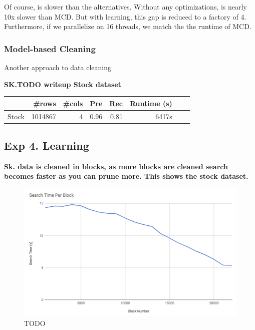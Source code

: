 Of course, \sys is slower than the alternatives. 
Without any optimizations, \sys is nearly 10x slower than MCD.
But with learning, this gap is reduced to a factory of 4.
Furthermore, if we parallelize on 16 threads, we match the the runtime of MCD.

\subsubsection{Model-based Cleaning}
Another approach to data cleaning

\textbf{SK.TODO writeup Stock dataset}


\begin{table}[ht]
\centering
\begin{tabular}{|l|r|r|r|r|r|r|r|}
\hline
 & \#rows & \#cols & Pre & Rec & Runtime (s) \\
\hline
Stock	&1014867&4& 0.96&	0.81&	6417s\\
\hline
\end{tabular}
\end{table}





\subsection*{Exp 4. Learning}


\textbf{Sk. data is cleaned in blocks, as more blocks are cleaned search becomes faster as you can prune more. This shows the stock dataset.}

 \begin{figure}[ht]
\centering
 \includegraphics[width=0.9\columnwidth]{figures/draft-blocks.png}
 \caption{TODO
 \label{fig:opt}}
\end{figure}


